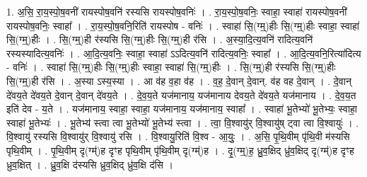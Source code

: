 \documentclass[17pt]{extarticle}
\begin{document}
1. अ॒सि॒ रा॒य॒स्पो॒ष॒वनी॑ रायस्पोष॒वनि॑ रस्यसि रायस्पोष॒वनिः॑ । . रा॒य॒स्पो॒ष॒वनिः॒ स्वाहा॒ स्वाहा॑ रायस्पोष॒वनी॑ रायस्पोष॒वनिः॒ स्वाहा᳚ । . रा॒य॒स्पो॒ष॒वनि॒रिति॑ रायस्पोष - वनिः॑ । . स्वाहा॑ सि॒(ग्म्॒)हीः सि॒(ग्म्॒)हीः स्वाहा॒ स्वाहा॑ सि॒(ग्म्॒)हीः । . सि॒(ग्म्॒)ही र॑स्यसि सि॒(ग्म्॒)हीः सि॒(ग्म्॒)ही र॑सि । . अ॒स्या॒दि॒त्य॒वनि॑ रादित्य॒वनि॑ रस्यस्यादित्य॒वनिः॑ । . आ॒दि॒त्य॒वनिः॒ स्वाहा॒ स्वाहा॑ ऽऽदित्य॒वनि॑ रादित्य॒वनिः॒ स्वाहा᳚ । . आ॒दि॒त्य॒वनि॒रित्या॑दित्य - वनिः॑ । . स्वाहा॑ सि॒(ग्म्॒)हीः सि॒(ग्म्॒)हीः स्वाहा॒ स्वाहा॑ सि॒(ग्म्॒)हीः । . सि॒(ग्म्॒)ही र॑स्यसि सि॒(ग्म्॒)हीः सि॒(ग्म्॒)ही र॑सि । . अ॒स्या ऽस्य॒स्या । . आ व॑ह व॒हा व॑ह । . व॒ह॒ दे॒वान् दे॒वान्. व॑ह वह दे॒वान् । . दे॒वान् दे॑वय॒ते दे॑वय॒ते दे॒वान् दे॒वान् दे॑वय॒ते । . दे॒व॒य॒ते यज॑मानाय॒ यज॑मानाय देवय॒ते दे॑वय॒ते यज॑मानाय । . दे॒व॒य॒त इति॑ देव - य॒ते । . यज॑मानाय॒ स्वाहा॒ स्वाहा॒ यज॑मानाय॒ यज॑मानाय॒ स्वाहा᳚ । . स्वाहा॑ भू॒तेभ्यो॑ भू॒तेभ्यः॒ स्वाहा॒ स्वाहा॑ भू॒तेभ्यः॑ । . भू॒तेभ्य॑ स्त्वा त्वा भू॒तेभ्यो॑ भू॒तेभ्य॑ स्त्वा । . त्वा॒ वि॒श्वायु॑र् वि॒श्वायु॑ष् ट्वा त्वा वि॒श्वायुः॑ । . वि॒श्वायु॑ रस्यसि वि॒श्वायु॑र् वि॒श्वायु॑ रसि । . वि॒श्वायु॒रिति॑ वि॒श्व - आ॒युः॒ । . अ॒सि॒ पृ॒थि॒वीम् पृ॑थि॒वी म॑स्यसि पृथि॒वीम् । . पृ॒थि॒वीम् दृ(ग्म्॑)ह दृꣳह पृथि॒वीम् पृ॑थि॒वीम् दृ(ग्म्॑)ह । . दृ॒(ग्म्॒)ह॒ ध्रु॒व॒क्षिद् ध्रु॑व॒क्षिद् दृ(ग्म्॑)ह दृꣳह ध्रुव॒क्षित् । . ध्रु॒व॒क्षि द॑स्यसि ध्रुव॒क्षिद् ध्रु॑व॒क्षि द॑सि । \newline
\end{document}
